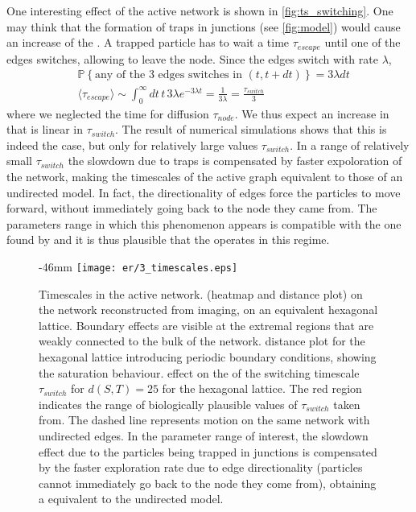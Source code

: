 One interesting effect of the active network is shown in \cref{fig:ts_switching}. One may think that the formation of traps in junctions (see \cref{fig:model}) would cause an increase of the . A trapped particle has to wait a time $\tau_{escape}$ until one of the edges switches, allowing to leave the node. Since the edges switch with rate $\lambda$,
\begin{align}
  &\mathbb{P}\left\{ \text{any of the 3 edges switches in }(t, t + dt)\right\} = 3\lambda dt\\
  &\langle \tau_{escape}\rangle \sim \int_{0}^{\infty} dt \,t\,3\lambda e^{-3\lambda t} = \frac{1}{3\lambda} = \frac{\tau_{switch}}{3}
\end{align}
where we neglected the time for diffusion $\tau_{node}$. We thus expect an increase in  that is linear in $\tau_{switch}$. The result of numerical simulations shows that this is indeed the case, but only for relatively large values $\tau_{switch}$. In a range of relatively small $\tau_{switch}$ the slowdown due to traps is compensated by faster expoloration of the network, making the timescales of the active graph equivalent to those of an undirected model. In fact, the directionality of edges force the particles to move forward, without immediately going back to the node they came from. The parameters range in which this phenomenon appears is compatible with the one found by \citeauthor{holcman2018single} and it is thus plausible that the  operates in this regime.

\begin{figure}
  \begin{adjustwidth*}{}{-46mm}
    \texttt{[image: er/3\_timescales.eps]}%
    {{\label{fig:ts_er}}%
    {\label{fig:ts_hex}}%
    {\label{fig:ts_hex_pbc}}%
    {\label{fig:ts_switching}}}%
    \caption{Timescales in the active network.
    \enskip{} (heatmap and distance plot) on the network reconstructed from  imaging, \enskip{} on an equivalent hexagonal lattice. Boundary effects are visible at the extremal regions that are weakly connected to the bulk of the network.   distance plot for the hexagonal lattice introducing periodic boundary conditions, showing the saturation behaviour.
    \enskip effect on the  of the switching timescale $\tau_{switch}$ for $d(S, T) = 25$ for the hexagonal lattice. The red region indicates the range of biologically plausible values of $\tau_{switch}$ taken from. The dashed line represents motion on the same network with undirected edges. In the parameter range of interest, the slowdown effect due to the particles being trapped in junctions is compensated by the faster exploration rate due to edge directionality (particles cannot immediately go back to the node they come from), obtaining a  equivalent to the undirected model.\label{fig:ts}}
  \end{adjustwidth*}
\end{figure}

